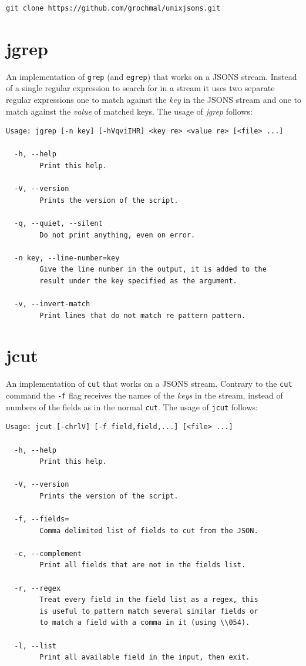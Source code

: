 \documentclass[11pt,a4paper,twoside,openright]{report}
\begin{document}
\begin{verbatim}
git clone https://github.com/grochmal/unixjsons.git
\end{verbatim}


\section{jgrep}

An implementation of \texttt{grep} (and \texttt{egrep}) that works on a JSONS
stream.  Instead of a single regular expression to search for in a stream it
uses two separate regular expressions one to match against the \emph{key} in
the JSONS stream and one to match against the \emph{value} of matched keys.
The usage of \emph{jgrep} follows:

{\small
\begin{Verbatim}[samepage=true]
Usage: jgrep [-n key] [-hVqviIHR] <key re> <value re> [<file> ...]

  -h, --help
        Print this help.

  -V, --version
        Prints the version of the script.

  -q, --quiet, --silent
        Do not print anything, even on error.

  -n key, --line-number=key
        Give the line number in the output, it is added to the
        result under the key specified as the argument.

  -v, --invert-match
        Print lines that do not match re pattern pattern.
\end{Verbatim}
}

\section{jcut}

An implementation of \texttt{cut} that works on a JSONS stream.  Contrary to
the \texttt{cut} command the \texttt{-f} flag receives the names of the
\emph{keys} in the stream, instead of numbers of the fields as in the normal
\texttt{cut}.  The usage of \texttt{jcut} follows:

{\small
\begin{Verbatim}[samepage=true]
Usage: jcut [-chrlV] [-f field,field,...] [<file> ...]

  -h, --help
        Print this help.

  -V, --version
        Prints the version of the script.

  -f, --fields=
        Comma delimited list of fields to cut from the JSON.

  -c, --complement
        Print all fields that are not in the fields list.

  -r, --regex
        Treat every field in the field list as a regex, this
        is useful to pattern match several similar fields or
        to match a field with a comma in it (using \\054).

  -l, --list
        Print all available field in the input, then exit.
\end{Verbatim}
}
\end{document}
